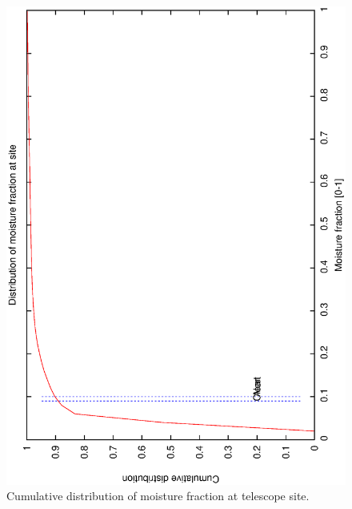 \begin{figure}[htbp]
\begin{center}
    \includegraphics[scale=0.4, angle=-90]{figures/ecs/moist_cum.dat.eps}
\caption[Cumulative distribution of moisture fraction at telescope site.]
{Cumulative distribution of moisture fraction at telescope site.}
\end{center} 
  \label{fig:met_moisture_cum_dist}
\end{figure}

